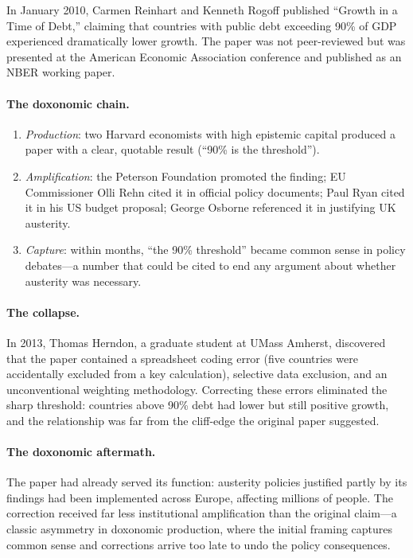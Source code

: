 \begin{example}
\label{ex:reinhart-rogoff}
In January 2010, Carmen Reinhart and Kenneth Rogoff published ``Growth in a Time of Debt,'' claiming that countries with public debt exceeding 90\% of GDP experienced dramatically lower growth.
The paper was not peer-reviewed but was presented at the American Economic Association conference and published as an NBER working paper.

\paragraph{The doxonomic chain.}
\begin{enumerate}[nosep]
  \item \emph{Production}: two Harvard economists with high epistemic capital produced a paper with a clear, quotable result (``90\% is the threshold'').
  \item \emph{Amplification}: the Peterson Foundation promoted the finding; EU Commissioner Olli Rehn cited it in official policy documents; Paul Ryan cited it in his US budget proposal; George Osborne referenced it in justifying UK austerity.
  \item \emph{Capture}: within months, ``the 90\% threshold'' became common sense in policy debates---a number that could be cited to end any argument about whether austerity was necessary.
\end{enumerate}

\paragraph{The collapse.}
In 2013, Thomas Herndon, a graduate student at UMass Amherst, discovered that the paper contained a spreadsheet coding error (five countries were accidentally excluded from a key calculation), selective data exclusion, and an unconventional weighting methodology.
Correcting these errors eliminated the sharp threshold: countries above 90\% debt had lower but still positive growth, and the relationship was far from the cliff-edge the original paper suggested.

\paragraph{The doxonomic aftermath.}
The paper had already served its function: austerity policies justified partly by its findings had been implemented across Europe, affecting millions of people.
The correction received far less institutional amplification than the original claim---a classic asymmetry in doxonomic production, where the initial framing captures common sense and corrections arrive too late to undo the policy consequences.
\end{example}

